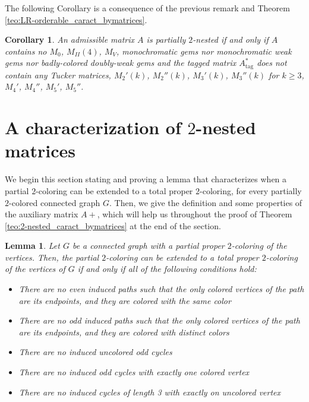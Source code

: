 \documentclass[12pt]{book}
\theoremstyle{plain}
\newtheorem{cor}[teo]{Corollary}
\newtheorem{lema}[teo]{Lemma}
\theoremstyle{remark}
\newcommand*{\tagg}{\mathrm{tag}}%
\begin{document}
The following Corollary is a consequence of the previous remark and Theorem \ref{teo:LR-orderable_caract_bymatrices}.

\begin{cor} \label{cor:partially_2-nested_caract}
	An admissible matrix $A$ is partially $2$-nested if and only if $A$ contains no $M_0$, $M_{II}(4)$, $M_V$, monochromatic gems nor monochromatic weak gems nor badly-colored doubly-weak gems and the tagged matrix $A^*_{\tagg}$ does not contain any Tucker matrices, $M_2'(k)$, $M_2''(k)$, $M_3'(k)$, $M_3''(k)$ for $k\geq 3$, $M_4'$, $M_4''$, $M_5'$, $M_5''$.
\end{cor} 



\section{A characterization of $2$-nested matrices} \label{section:2nestedmatrices}

We begin this section stating and proving a lemma that characterizes when a partial $2$-coloring can be extended to a total proper $2$-coloring, for every partially $2$-colored connected graph $G$.
Then, we give the definition and some properties of the auxiliary matrix $A+$, which will help us throughout the proof of Theorem \ref{teo:2-nested_caract_bymatrices} at the end of the section.

\begin{lema} \label{lema:2-color-extension}
	Let $G$ be a connected graph with a partial proper $2$-coloring of the vertices. Then, the partial $2$-coloring can be extended to a total proper $2$-coloring of the vertices of $G$ if and only if all of the following conditions hold:
	\begin{itemize}
		\item There are no even induced paths such that the only colored vertices of the path are its endpoints, and they are colored with the same color
		\item There are no odd induced paths such that the only colored vertices of the path are its endpoints, and they are colored with distinct colors
		\item There are no induced uncolored odd cycles
		\item There are no induced odd cycles with exactly one colored vertex
		\item There are no induced cycles of length 3 with exactly on uncolored vertex
	\end{itemize}	  
\end{lema}
\end{document}
